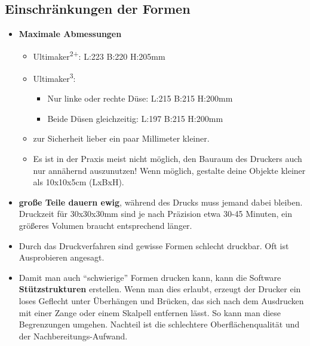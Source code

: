 \documentclass{\basedir/fablab-document}
\newcommand{\ts}[1]{\textsuperscript{#1}}
\begin{document}
\subsection{Einschränkungen der Formen}
\begin{itemize}
\item \textbf{Maximale Abmessungen}
\begin{itemize}
 \item Ultimaker\ts{2+}: L:223 B:220 H:205mm
 \item Ultimaker\ts3:
 \begin{itemize}
   \item Nur linke oder rechte Düse: L:215 B:215 H:200mm
   \item Beide Düsen gleichzeitig: L:197 B:215 H:200mm
 \end{itemize}
 \item zur Sicherheit lieber ein paar Millimeter kleiner.
 \item Es ist in der Praxis meist nicht möglich, den Bauraum des Druckers auch nur annähernd auszunutzen! Wenn möglich, gestalte deine Objekte kleiner als 10x10x5cm (LxBxH).
\end{itemize}
\item \textbf{große Teile dauern ewig}, während des Drucks muss jemand dabei bleiben. Druckzeit für 30x30x30mm sind je
nach Präzision etwa 30-45 Minuten, ein größeres Volumen braucht entsprechend länger.
\item Durch das Druckverfahren sind gewisse Formen schlecht druckbar. Oft ist Ausprobieren angesagt.
\item Damit man auch \enquote{schwierige} Formen drucken kann, kann die Software \textbf{Stützstrukturen} erstellen. Wenn man dies erlaubt,
erzeugt der Drucker ein loses Geflecht unter Überhängen und Brücken,
das sich nach dem Ausdrucken mit einer Zange oder einem Skalpell entfernen lässt. So kann
man diese Begrenzungen umgehen. Nachteil ist die schlechtere
Oberflächenqualität und der Nachbereitungs-Aufwand.
\end{itemize}
\end{document}
